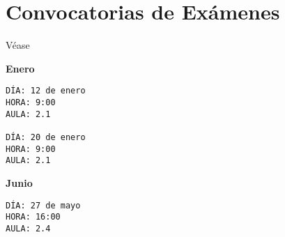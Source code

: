 \documentclass[11pt,a4paper]{article}
\begin{document}
\section{Convocatorias de Exámenes}
Véase


{\bf Enero}
\begin{verbatim}
DÍA: 12 de enero
HORA: 9:00
AULA: 2.1

DÍA: 20 de enero
HORA: 9:00
AULA: 2.1
\end{verbatim}

{\bf Junio}
\begin{verbatim}
DÍA: 27 de mayo
HORA: 16:00
AULA: 2.4
\end{verbatim}
\end{document}

